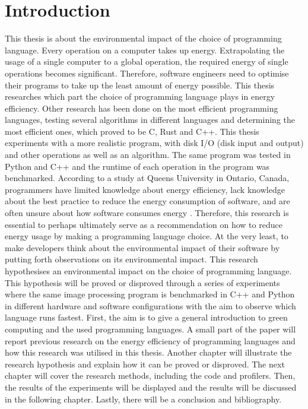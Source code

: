 \chapter{Introduction}
\setcounter{page}{1}

This thesis is about the environmental impact of the choice of programming language. Every operation on a computer takes up energy. Extrapolating the usage of a single computer to a global operation, the required energy of single operations becomes significant. Therefore, software engineers need to optimise their programs to take up the least amount of energy possible. This thesis researches which part the choice of programming language plays in energy efficiency.
Other research has been done on the most efficient programming languages, testing several algorithms in different languages and determining the most efficient ones, which proved to be C, Rust and C++. This thesis experiments with a more realistic program, with disk I/O (disk input and output) and other operations as well as an algorithm. The same program was tested in Python and C++ and the runtime of each operation in the program was benchmarked.
According to a study at Queens University in Ontario, Canada, programmers have limited knowledge about energy efficiency, lack knowledge about the best practice to reduce the energy consumption of software, and are often unsure about how software consumes energy \cite{programmers}.
Therefore, this research is essential to perhaps ultimately serve as a recommendation on how to reduce energy usage by making a programming language choice. At the very least, to make developers think about the environmental impact of their software by putting forth observations on its environmental impact.
This research hypothesises an environmental impact on the choice of programming language. This hypothesis will be proved or disproved through a series of experiments where the same image processing program is benchmarked in C++ and Python in different hardware and software configurations with the aim to observe which language runs fastest.
First, the aim is to give a general introduction to green computing and the used programming languages. A small part of the paper will report previous research on the energy efficiency of programming languages and how this research was utilised in this thesis. Another chapter will illustrate the research hypothesis and explain how it can be proved or disproved. The next chapter will cover the research methods, including the code and profilers. Then, the results of the experiments will be displayed and the results will be discussed in the following chapter. Lastly, there will be a conclusion and bibliography.
